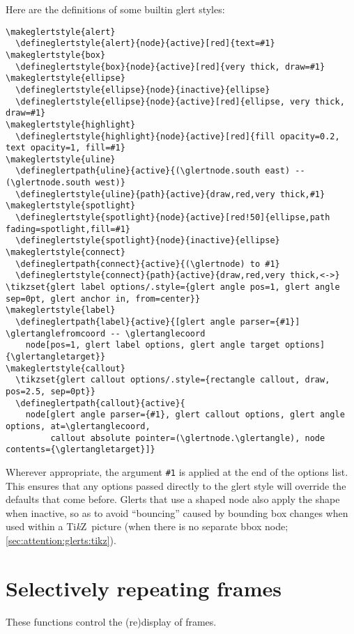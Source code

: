\documentclass[a4paper]{ltxdoc}
\def\TikZ{Ti\textit{k}Z}
\def\ttx#1{\texttt{#1}}
\def\locsection#1{\addtocontents{loc}{\vskip2ex\protect\item{\large \bf #1}}}
\begin{document}
\begin{gather<>}
Here are the definitions of some builtin glert styles:
\begin{verbatim}
\makeglertstyle{alert}
  \defineglertstyle{alert}{node}{active}[red]{text=#1}
\makeglertstyle{box}
  \defineglertstyle{box}{node}{active}[red]{very thick, draw=#1}
\makeglertstyle{ellipse}
  \defineglertstyle{ellipse}{node}{inactive}{ellipse}
  \defineglertstyle{ellipse}{node}{active}[red]{ellipse, very thick, draw=#1}
\makeglertstyle{highlight}
  \defineglertstyle{highlight}{node}{active}[red]{fill opacity=0.2, text opacity=1, fill=#1}
\makeglertstyle{uline}
  \defineglertpath{uline}{active}{(\glertnode.south east) -- (\glertnode.south west)}
  \defineglertstyle{uline}{path}{active}{draw,red,very thick,#1}
\makeglertstyle{spotlight}
  \defineglertstyle{spotlight}{node}{active}[red!50]{ellipse,path fading=spotlight,fill=#1}
  \defineglertstyle{spotlight}{node}{inactive}{ellipse}
\makeglertstyle{connect}
  \defineglertpath{connect}{active}{(\glertnode) to #1}
  \defineglertstyle{connect}{path}{active}{draw,red,very thick,<->}
\tikzset{glert label options/.style={glert angle pos=1, glert angle sep=0pt, glert anchor in, from=center}}
\makeglertstyle{label}
  \defineglertpath{label}{active}{[glert angle parser={#1}] \glertanglefromcoord -- \glertanglecoord 
    node[pos=1, glert label options, glert angle target options] {\glertangletarget}}
\makeglertstyle{callout}
  \tikzset{glert callout options/.style={rectangle callout, draw, pos=2.5, sep=0pt}}
  \defineglertpath{callout}{active}{
    node[glert angle parser={#1}, glert callout options, glert angle options, at=\glertanglecoord,
         callout absolute pointer=(\glertnode.\glertangle), node contents={\glertangletarget}]}
\end{verbatim}
Wherever appropriate, the argument \ttx{\#1} is applied at the end of the
options list.  This ensures that any options passed directly to the glert style
will override the defaults that come before.  Glerts that use a shaped node also
apply the shape when inactive, so as to avoid ``bouncing'' caused by bounding
box changes when used within a \TikZ\ picture (when there is no separate bbox
node; \cref{sec:attention:glerts:tikz}).

\section{Selectively repeating frames}\label{sec:again}
\locsection{Selectively repeating frames}

These functions control the (re)display of frames.


\end{gather<>}
\end{document}
